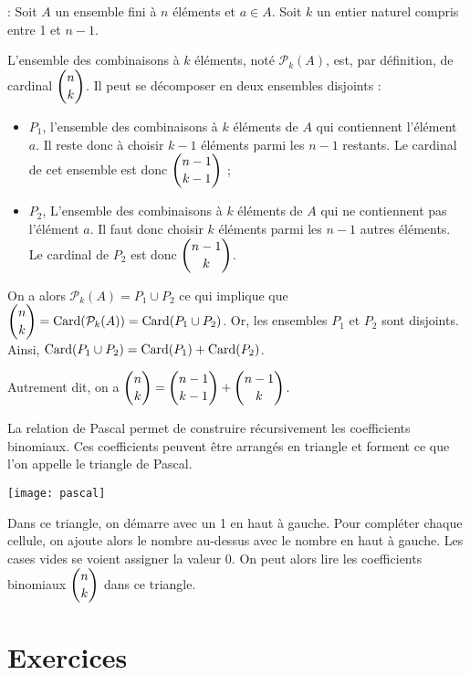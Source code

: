 \documentclass[11pt,fleqn, openany]{book} %
\begin{document}
\begin{demonstration}[Combinatoire] : Soit $A$ un ensemble fini à $n$ éléments et $a\in A$. Soit $k$ un entier naturel compris entre 1 et $n-1$. 

L'ensemble des combinaisons à $k$ éléments, noté $\mathcal{P}_k(A)$, est, par définition, de cardinal $\dbinom{n}{k}$. Il peut se décomposer en deux ensembles disjoints :
\begin{itemize}
\item $P_1$, l'ensemble des combinaisons à $k$ éléments de $A$ qui contiennent l'élément $a$. Il reste donc à choisir $k-1$ éléments parmi les $n-1$ restants. Le cardinal de cet ensemble est donc $\dbinom{n-1}{k-1}$ ;
\item $P_2$, L'ensemble des combinaisons à $k$ éléments de $A$ qui ne contiennent pas l'élément $a$. Il faut donc choisir $k$ éléments parmi les $n-1$ autres éléments. Le cardinal de $P_2$ est donc $\dbinom{n-1}{k}$.
\end{itemize}
On a alors $\mathcal{P}_k(A)=P_1 \cup P_2$ ce qui implique que $\dbinom{n}{k} = \mathrm{Card}(\mathcal{P}_k(A))=\mathrm{Card}(P_1 \cup P_2)$. Or, les ensembles $P_1$ et $P_2$ sont disjoints. Ainsi, $\mathrm{Card}(P_1 \cup P_2)= \mathrm{Card}(P_1)+\mathrm{Card}(P_2)$. 

Autrement dit, on a $\dbinom{n}{k}=\dbinom{n-1}{k-1}+\dbinom{n-1}{k}$.\end{demonstration}


\begin{proposition}La relation de Pascal permet de construire récursivement les coefficients binomiaux. Ces coefficients peuvent être arrangés en triangle et forment ce que l'on appelle le triangle de Pascal.
\vskip5pt
\begin{minipage}{0.45\linewidth}
\begin{center}
\texttt{[image: pascal]}
\end{center}
\end{minipage}\hfill\begin{minipage}{0.5\linewidth}
Dans ce triangle, on démarre avec un 1 en haut à gauche. Pour compléter chaque cellule, on ajoute alors le nombre au-dessus avec le nombre en haut à gauche. Les cases vides se voient assigner la valeur 0. On peut alors lire les coefficients binomiaux $\dbinom{n}{k}$ dans ce triangle.
\end{minipage}




\end{proposition}

\chapter{Exercices}
\end{document}
